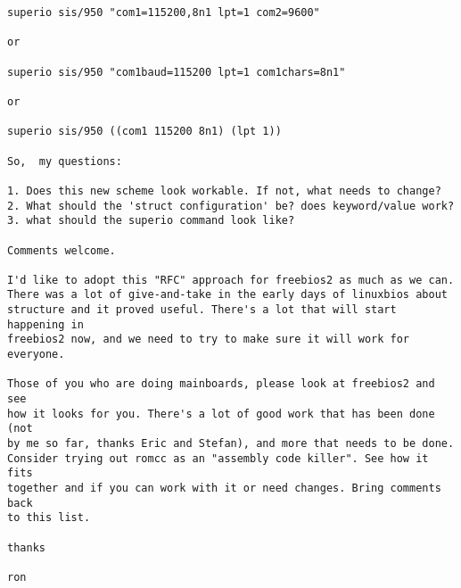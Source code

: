 \begin{verbatim}
superio sis/950 "com1=115200,8n1 lpt=1 com2=9600"

or

superio sis/950 "com1baud=115200 lpt=1 com1chars=8n1"

or

superio sis/950 ((com1 115200 8n1) (lpt 1))

So,  my questions:

1. Does this new scheme look workable. If not, what needs to change?
2. What should the 'struct configuration' be? does keyword/value work? 
3. what should the superio command look like? 

Comments welcome.

I'd like to adopt this "RFC" approach for freebios2 as much as we can.  
There was a lot of give-and-take in the early days of linuxbios about
structure and it proved useful. There's a lot that will start happening in
freebios2 now, and we need to try to make sure it will work for everyone.

Those of you who are doing mainboards, please look at freebios2 and see
how it looks for you. There's a lot of good work that has been done (not
by me so far, thanks Eric and Stefan), and more that needs to be done. 
Consider trying out romcc as an "assembly code killer". See how it fits 
together and if you can work with it or need changes. Bring comments back 
to this list. 

thanks

ron

\end{verbatim}
